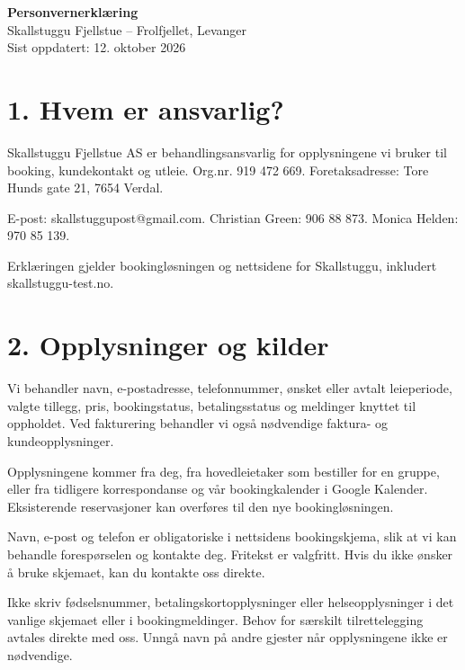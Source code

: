 \documentclass[12pt,a4paper]{article}
\begin{document}
\begin{center}
{\LARGE\textbf{Personvernerklæring}}\\[6pt]
{\large Skallstuggu Fjellstue -- Frolfjellet, Levanger}\\[6pt]
\small Sist oppdatert: 12. oktober 2026
\end{center}

\section{1. Hvem er ansvarlig?}
Skallstuggu Fjellstue AS er behandlingsansvarlig for opplysningene vi bruker til booking, kundekontakt og utleie. Org.nr. 919 472 669. Foretaksadresse: Tore Hunds gate 21, 7654 Verdal.

E-post: skallstuggupost@gmail.com. Christian Green: 906 88 873. Monica Helden: 970 85 139.

Erklæringen gjelder bookingløsningen og nettsidene for Skallstuggu, inkludert skallstuggu-test.no.


\section{2. Opplysninger og kilder}
Vi behandler navn, e-postadresse, telefonnummer, ønsket eller avtalt leieperiode, valgte tillegg, pris, bookingstatus, betalingsstatus og meldinger knyttet til oppholdet. Ved fakturering behandler vi også nødvendige faktura- og kundeopplysninger.

Opplysningene kommer fra deg, fra hovedleietaker som bestiller for en gruppe, eller fra tidligere korrespondanse og vår bookingkalender i Google Kalender. Eksisterende reservasjoner kan overføres til den nye bookingløsningen.

Navn, e-post og telefon er obligatoriske i nettsidens bookingskjema, slik at vi kan behandle forespørselen og kontakte deg. Fritekst er valgfritt. Hvis du ikke ønsker å bruke skjemaet, kan du kontakte oss direkte.

Ikke skriv fødselsnummer, betalingskortopplysninger eller helseopplysninger i det vanlige skjemaet eller i bookingmeldinger. Behov for særskilt tilrettelegging avtales direkte med oss. Unngå navn på andre gjester når opplysningene ikke er nødvendige.
\end{document}
